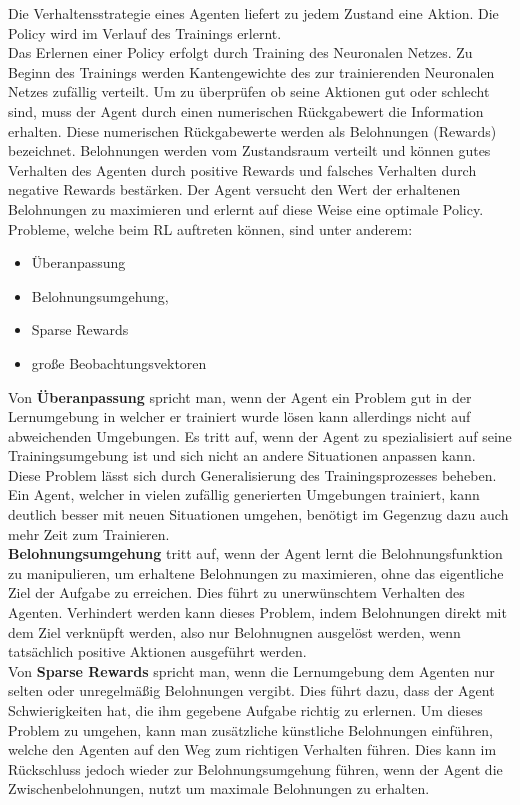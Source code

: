 Die Verhaltensstrategie  eines Agenten liefert zu jedem Zustand eine Aktion. Die Policy wird im Verlauf des Trainings erlernt.\\
Das Erlernen einer Policy erfolgt durch Training des Neuronalen Netzes. Zu Beginn des Trainings werden Kantengewichte des zur trainierenden Neuronalen Netzes zufällig verteilt. Um zu überprüfen ob seine Aktionen gut oder schlecht sind, muss der Agent durch einen numerischen Rückgabewert die Information erhalten. Diese numerischen Rückgabewerte werden als Belohnungen (Rewards) bezeichnet. Belohnungen werden vom Zustandsraum verteilt und können gutes Verhalten des Agenten durch positive Rewards und falsches Verhalten durch negative Rewards bestärken.
Der Agent versucht den Wert der erhaltenen Belohnungen zu maximieren und erlernt auf diese Weise eine optimale Policy. \\
\newpage
Probleme, welche beim RL auftreten können, sind unter anderem:  
\begin{itemize}
    \item Überanpassung 
    \item Belohnungsumgehung, 
    \item Sparse Rewards
    \item große Beobachtungsvektoren
\end{itemize}
Von \textbf{Überanpassung} spricht man, wenn der Agent ein Problem gut in der Lernumgebung in welcher er trainiert wurde lösen kann allerdings nicht auf abweichenden Umgebungen. Es tritt auf, wenn der Agent zu spezialisiert auf seine Trainingsumgebung ist und sich nicht an andere Situationen anpassen kann. Diese Problem lässt sich durch Generalisierung des Trainingsprozesses beheben. Ein Agent, welcher in vielen zufällig generierten Umgebungen trainiert, kann deutlich besser mit neuen Situationen umgehen, benötigt im Gegenzug dazu auch mehr Zeit zum Trainieren. \\
\textbf{Belohnungsumgehung} tritt auf, wenn der Agent lernt die Belohnungsfunktion zu manipulieren, um erhaltene Belohnungen zu maximieren, ohne das eigentliche Ziel der Aufgabe zu erreichen. Dies führt zu unerwünschtem Verhalten des Agenten. Verhindert werden kann dieses Problem, indem Belohnungen direkt mit dem Ziel verknüpft werden, also nur Belohnugnen ausgelöst werden, wenn tatsächlich positive Aktionen ausgeführt werden. \\
Von \textbf{Sparse Rewards} spricht man, wenn die Lernumgebung dem Agenten nur selten oder unregelmäßig Belohnungen vergibt. Dies führt dazu, dass der Agent Schwierigkeiten hat, die ihm gegebene Aufgabe richtig zu erlernen. Um dieses Problem zu umgehen, kann man zusätzliche künstliche Belohnungen einführen, welche den Agenten auf den Weg zum richtigen Verhalten führen. Dies kann im Rückschluss jedoch wieder zur Belohnungsumgehung führen, wenn der Agent die Zwischenbelohnungen, nutzt um maximale Belohnungen zu erhalten. \\
